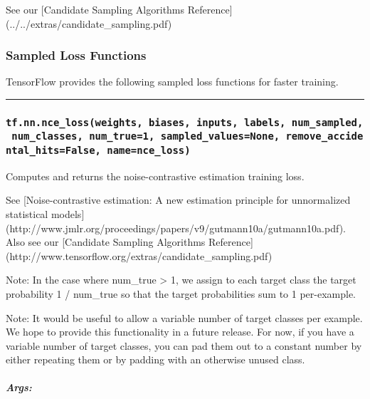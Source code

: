 See our {[}Candidate Sampling Algorithms Reference{]}
(../../extras/candidate\_sampling.pdf)

\subsubsection{Sampled Loss Functions }\label{sampled-loss-functions}

TensorFlow provides the following sampled loss functions for faster
training.

\begin{center}\rule{0.5\linewidth}{\linethickness}\end{center}

\subsubsection{\texorpdfstring{\texttt{tf.nn.nce\_loss(weights,\ biases,\ inputs,\ labels,\ num\_sampled,\ num\_classes,\ num\_true=1,\ sampled\_values=None,\ remove\_accidental\_hits=False,\ name=\textquotesingle{}nce\_loss\textquotesingle{})}
}{tf.nn.nce\_loss(weights, biases, inputs, labels, num\_sampled, num\_classes, num\_true=1, sampled\_values=None, remove\_accidental\_hits=False, name='nce\_loss') }}\label{tf.nn.nceux5flossweights-biases-inputs-labels-numux5fsampled-numux5fclasses-numux5ftrue1-sampledux5fvaluesnone-removeux5faccidentalux5fhitsfalse-namenceux5floss}

Computes and returns the noise-contrastive estimation training loss.

See {[}Noise-contrastive estimation: A new estimation principle for
unnormalized statistical models{]}
(http://www.jmlr.org/proceedings/papers/v9/gutmann10a/gutmann10a.pdf).
Also see our {[}Candidate Sampling Algorithms Reference{]}
(http://www.tensorflow.org/extras/candidate\_sampling.pdf)

Note: In the case where num\_true \textgreater{} 1, we assign to each
target class the target probability 1 / num\_true so that the target
probabilities sum to 1 per-example.

Note: It would be useful to allow a variable number of target classes
per example. We hope to provide this functionality in a future release.
For now, if you have a variable number of target classes, you can pad
them out to a constant number by either repeating them or by padding
with an otherwise unused class.

\subparagraph{Args: }\label{args-23}

